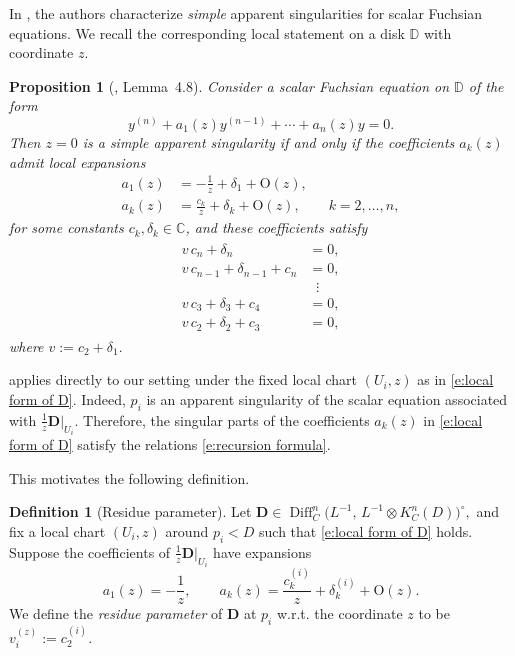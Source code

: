 \documentclass[twoside, 11pt]{article}
\numberwithin{equation}{section}
\theoremstyle{theorem}
\numberwithin{theorem}{section}
\newtheorem{proposition}[proposition]{Proposition}
\theoremstyle{definition}
\newtheorem{definition}[definition]{Definition}
\begin{document}
In \cite{DM07}, the authors characterize \emph{simple} apparent singularities for
scalar Fuchsian equations. We recall the corresponding local statement on a disk \(\mathbb D\) with coordinate \(z\).

\begin{proposition}[\cite{DM07}, Lemma~4.8]\label{p:AS for fuchsian}
Consider a scalar Fuchsian equation on \(\mathbb D\) of the form
\[
y^{(n)}+a_1(z)y^{(n-1)}+\cdots+a_n(z)y=0.
\]
Then \(z=0\) is a simple apparent singularity if and only if the coefficients
\(a_k(z)\) admit local expansions
\begin{align}\label{e: single part of a_i}
  a_1(z) &= -\frac{1}{z}+\delta_1+\mathrm O(z), \\
  a_k(z) &= \frac{c_k}{z}+\delta_k+\mathrm O(z), \qquad k=2,\dots,n,
\end{align}
for some constants \(c_k,\delta_k\in \mathbb C\), and these coefficients satisfy
\begin{align}\label{e:recursion formula}
\begin{split}
  v\, c_n+\delta_n &= 0, \\
  v\, c_{n-1}+\delta_{n-1}+c_n &= 0, \\
  &\;\;\vdots \\
  v\, c_3+\delta_3+c_4 &= 0, \\
  v\, c_2+\delta_2+c_3 &= 0,
\end{split}
\end{align}
where
\(
v:=c_2+\delta_1.
\)
\end{proposition}


 applies directly to our setting under the fixed local chart
\((U_i,z)\) as in \eqref{e:local form of D}.  Indeed, \(p_i\) is an apparent
singularity of the scalar equation associated with
\(
\frac{1}{z}\mathbf D|_{U_i}.
\)
Therefore, the singular parts of the coefficients \(a_k(z)\) in
\eqref{e:local form of D} satisfy the relations \eqref{e:recursion formula}.

This motivates the following definition.
\begin{definition}[Residue parameter]\label{def: res para}
Let
\(
\mathbf D \in \operatorname{Diff}_C^{n}\bigl(L^{-1},\,L^{-1}\otimes K_C^{n}(D)\bigr)^\circ,
\)
and fix a local chart \((U_i,z)\) around \(p_i < D\) such that
\eqref{e:local form of D} holds.  Suppose the coefficients of
\(\frac{1}{z}\mathbf D|_{U_i}\) have expansions
\[
a_1(z)=-\frac{1}{z},\qquad
a_k(z)=\frac{c_k^{(i)}}{z}+\delta_k^{(i)}+ \mathrm O(z).
\]
We define the \emph{residue parameter} of \(\mathbf D\) at \(p_i\) w.r.t.
the coordinate \(z\) to be
\(
v_i^{(z)}:=c_2^{(i)}.
\)
\end{definition}
\end{document}
